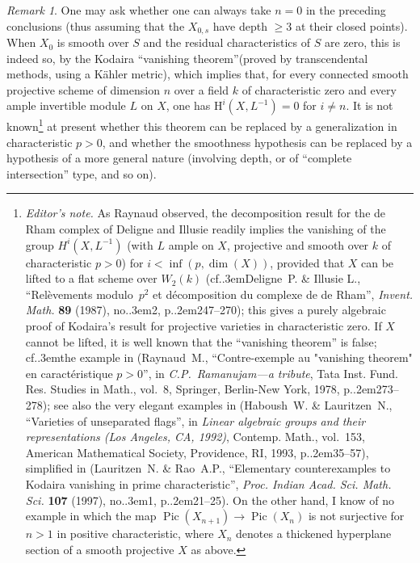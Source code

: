 \documentclass[11pt,a4paper,oneside]{book}
\providecommand{\nde}[1]{\footnote{\textit{Editor's note.} #1}}
\providecommand{\og}{``}
\providecommand{\fg}{''\xspace}
\providecommand{\cf}{cf.\kern.3em}
\providecommand{\ptbl}{.\kern.2em}
\providecommand{\numero}{no.\kern.3em}
\providecommand{\Pic}{\operatorname{Pic}}
\renewcommand{\H}{\mathrm H}
\theoremstyle{plain}
\theoremstyle{definition}
\theoremstyle{remark}
\newtheorem{remarque}[subsection]{Remark}
\begin{document}
\begin{remarque}
One may ask whether one can always take $n=0$ in the preceding conclusions (thus assuming that the $X_{0,s}$ have depth $\geq 3$ at their closed points). When $X_0$ is smooth over $S$ and the residual characteristics of $S$ are zero, this is indeed so, by the Kodaira \og vanishing theorem\fg (proved by transcendental methods, using a K\"ahler metric), which implies that, for every connected smooth projective scheme of dimension $n$ over a field $k$ of characteristic zero and every ample invertible module $L$ on $X$, one has $\H^i(X,L^{-1})=0$ for $i\neq n$. It is not known\nde{As Raynaud observed, the decomposition result for the de Rham complex of Deligne and Illusie readily implies the vanishing of the group $H^i(X,L^{-1})$ (with $L$ ample on $X$, projective and smooth over $k$ of characteristic $p>0$) for $i<\inf(p,\dim(X))$, provided that $X$ can be lifted to a flat scheme over $W_2(k)$ (\cf Deligne~P. \& Illusie L., {\og Rel\`evements modulo~$p^2$ et d\'ecomposition du complexe de de Rham\fg}, \emph{Invent. Math.} \textbf{89} (1987), \numero 2, p\ptbl 247--270); this gives a purely algebraic proof of Kodaira's result for projective varieties in characteristic zero. If $X$ cannot be lifted, it is well known that the \og vanishing theorem\fg is false; \cf the example in (Raynaud~M., {\og Contre-exemple au "vanishing theorem" en caract\'eristique $p>0$\fg}, in \emph{C.P.~Ramanujam---a tribute}, Tata Inst. Fund. Res. Studies in Math., vol.~8, Springer, Berlin-New York, 1978, p\ptbl 273--278); see also the very elegant examples in (Haboush~W. \& Lauritzen~N., {\og Varieties of unseparated flags\fg}, in \emph{Linear algebraic groups and their representations (Los Angeles, CA, 1992)}, Contemp. Math., vol.~153, American Mathematical Society, Providence, RI, 1993, p\ptbl 35--57), simplified in (Lauritzen~N. \& Rao~A.P., {\og Elementary counterexamples to Kodaira vanishing in prime characteristic\fg}, \emph{Proc. Indian Acad. Sci. Math. Sci.} \textbf{107} (1997), \numero 1, p\ptbl 21--25). On the other hand, I know of no example in which the map $\Pic(X_{n+1})\to\Pic(X_n)$ is not surjective for $n>1$ in positive characteristic, where $X_n$ denotes a thickened hyperplane section of a smooth projective $X$ as above.} at present whether this theorem can be replaced by a generalization in characteristic $p>0$, and whether the smoothness hypothesis can be replaced by a hypothesis of a more general nature (involving depth, or of \og complete intersection\fg type, and so on).
\end{remarque}
\end{document}
